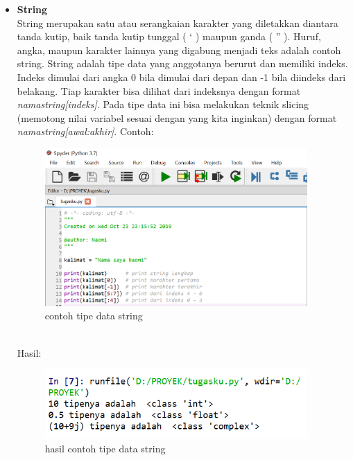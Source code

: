 \begin{enumerate}
\begin{itemize}
\item \textbf{String}\\
String merupakan satu atau serangkaian karakter yang diletakkan diantara tanda kutip, baik tanda kutip tunggal ( ‘ ) maupun ganda ( ” ). Huruf, angka, maupun karakter lainnya yang digabung menjadi teks adalah contoh string. String adalah tipe data yang anggotanya berurut dan memiliki indeks.\\ Indeks dimulai dari angka 0 bila dimulai dari depan dan -1 bila diindeks dari belakang. Tiap karakter bisa dilihat dari indeksnya dengan format\textit{ namastring[indeks]}. Pada tipe data ini bisa melakukan teknik slicing (memotong  nilai variabel sesuai dengan yang kita inginkan) dengan format \textit{namastring[awal:akhir]}. Contoh:
							\begin{figure}[!htbp]
							\centering
							\includegraphics[width=10cm]{gambar2/cth3.png}
							\caption{contoh tipe data string}
							\end{figure}\\
Hasil:
 						\begin{figure}[!htbp]
							\centering
							\includegraphics[width=10cm]{gambar2/hsl2.png}
							\caption{hasil contoh tipe data string}
							\end{figure}\\
							

\end{itemize}
\end{enumerate}
